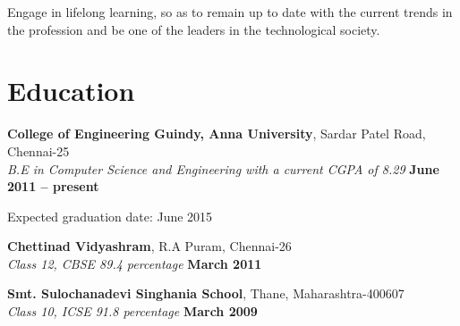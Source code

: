 \documentclass[margin,line]{resume}
\begin{document}
\begin{resume}
Engage in lifelong learning, so as to remain up to date with the current trends in the profession and be one of the leaders in the technological society. 
    \section{\mysidestyle Education}

    \textbf{College of Engineering Guindy, Anna University}, Sardar Patel Road, Chennai-25 \vspace{2mm}\\\vspace{1mm}%
    \textsl{B.E in Computer Science and Engineering with a current CGPA of 8.29} \hfill \textbf{June 2011 -- present}\vspace{-3mm}\vspace{-1mm}%
        \item Expected graduation date: June 2015
    
    \textbf{Chettinad Vidyashram}, R.A Puram, Chennai-26 \vspace{2mm}\\\vspace{1mm}%
    \textsl{Class 12, CBSE 89.4 percentage} \hfill \textbf{March 2011}\vspace{-3mm}\vspace{-1mm}%

    \textbf{Smt. Sulochanadevi Singhania School}, Thane, Maharashtra-400607 \vspace{2mm}\\\vspace{1mm}%
    \textsl{Class 10, ICSE 91.8 percentage} \hfill \textbf{March 2009}\vspace{-3mm}\\\vspace{-1mm}%

\end{resume}
\end{document}
